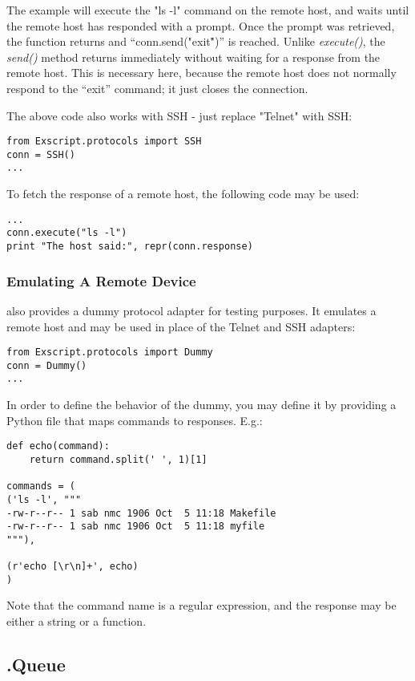 The example will execute the "ls -l" command on the remote host, and 
waits until the remote host has responded with a prompt.
Once the prompt was retrieved, the function returns and 
``conn.send("exit\r")'' is reached.
Unlike {\it execute()}, the {\it send()} method returns immediately without 
waiting for a response from the remote host. This is necessary here, because 
the remote host does not normally respond to the ``exit'' command; it just 
closes the connection.

The above code also works with SSH - just replace "Telnet" with SSH:

\begin{lstlisting}
from Exscript.protocols import SSH
conn = SSH()
...
\end{lstlisting}

To fetch the response of a remote host, the following code may be used:

\begin{lstlisting}
...
conn.execute("ls -l")
print "The host said:", repr(conn.response)
\end{lstlisting}


\subsubsection{Emulating A Remote Device}

\product also provides a dummy protocol adapter for testing 
purposes. It emulates a remote host and may be used in place of the Telnet 
and SSH adapters:

\begin{lstlisting}
from Exscript.protocols import Dummy
conn = Dummy()
...
\end{lstlisting}

In order to define the behavior of the dummy, you may define it by 
providing a Python file that maps commands to responses. E.g.:

\begin{lstlisting}
def echo(command):
    return command.split(' ', 1)[1]

commands = (
('ls -l', """
-rw-r--r-- 1 sab nmc 1906 Oct  5 11:18 Makefile
-rw-r--r-- 1 sab nmc 1906 Oct  5 11:18 myfile
"""),

(r'echo [\r\n]+', echo)
)
\end{lstlisting}

Note that the command name is a regular expression, and the response may 
be either a string or a function.


\subsection{\product.Queue}

